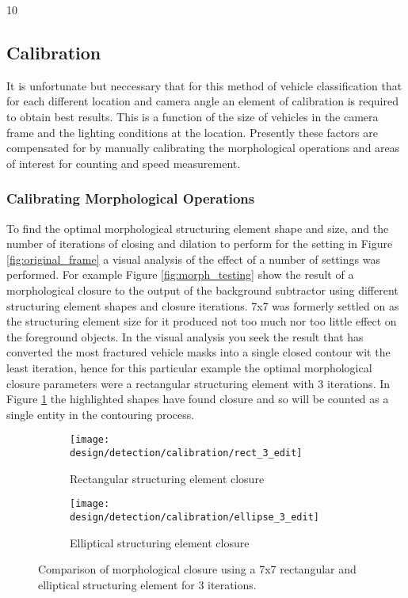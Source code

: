 10\subsection{Calibration}

It is unfortunate but neccessary that for this method of vehicle classification that for each different location and camera angle an element of calibration is required to obtain best results. This is a function of the size of vehicles in the camera frame and the lighting conditions at the location. Presently these factors are compensated for by manually calibrating the morphological operations and areas of interest for counting and speed measurement. 

\subsubsection{Calibrating Morphological Operations}

To find the optimal morphological structuring element shape and size, and the number of iterations of closing and dilation to perform for the setting in Figure \ref{fig:original_frame} a visual analysis of the effect of a number of settings was performed. For example Figure \ref{fig:morph_testing} show the result of a morphological closure to the output of the background subtractor using different structuring element shapes and closure iterations. 7x7 was formerly settled on as the structuring element size for it produced not too much nor too little effect on the foreground objects. In the visual analysis you seek the result that has converted the most fractured vehicle masks into a single closed contour wit the least iteration, hence for this particular example the optimal morphological closure parameters were a rectangular structuring element with 3 iterations. In Figure \ref{fig:compare_closure} the highlighted shapes have found closure and so will be counted as a single entity in the contouring process.


\begin{figure}[htbp]
    \begin{subfigure}[b]{0.45\textwidth}
        \texttt{[image: design/detection/calibration/rect\_3\_edit]}
        \captionsetup{format = hang}
        \caption{Rectangular structuring element closure}
    \end{subfigure}
    \begin{subfigure}[b]{0.45\textwidth}
        \texttt{[image: design/detection/calibration/ellipse\_3\_edit]}
        \captionsetup{format = hang}
        \caption{Elliptical structuring element closure}
    \end{subfigure}
    \captionsetup{format = hang}
    \caption{Comparison of morphological closure using a 7x7 rectangular and elliptical structuring element for 3 iterations.}
    \label{fig:compare_closure}
\end{figure}


